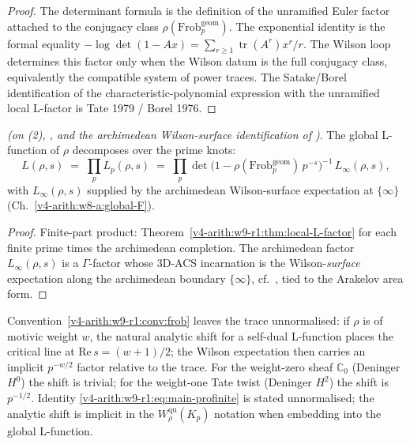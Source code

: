 \begin{proof}
The determinant formula is the definition of the unramified Euler factor
attached to the conjugacy class \(\rho(\mathrm{Frob}_{p}^{\mathrm{geom}})\). The
exponential identity is the formal equality
\(-\log\det(1-Ax)=\sum_{r\geq1}\operatorname{tr}(A^{r})x^r/r\). The
Wilson loop determines this factor only when the Wilson datum is the full
conjugacy class, equivalently the compatible system of power traces. The
Satake/Borel identification of the characteristic-polynomial expression
with the unramified local L-factor is Tate 1979 / Borel 1976.
\end{proof}

\begin{corollary}
\label{v4-arith:w9-r1:cor:global-L}
\ClaimStatusConditional \emph{(on
(2),
, and the archimedean Wilson-surface
identification of )}. The
global L-function of \(\rho\) decomposes over the prime knots:
\begin{equation}
\label{v4-arith:w9-r1:eq:global-L}
L(\rho,s)\;=\;\prod_{p}L_{p}(\rho,s)
\;=\;\prod_{p}\det\!\bigl(1-\rho(\mathrm{Frob}_{p}^{\mathrm{geom}})\,p^{-s}\bigr)^{-1}\,
L_{\infty}(\rho,s),
\end{equation}
with \(L_{\infty}(\rho,s)\) supplied by the archimedean Wilson-surface
expectation at \(\{\infty\}\) (Ch.~\ref{v4-arith:w8-a:global-F}).
\end{corollary}

\begin{proof}
Finite-part product: Theorem~\ref{v4-arith:w9-r1:thm:local-L-factor}
for each finite prime times the archimedean completion. The archimedean
factor \(L_{\infty}(\rho,s)\) is a \(\Gamma\)-factor whose 3D-ACS
incarnation is the Wilson-\emph{surface} expectation along the
archimedean boundary \(\{\infty\}\), cf.\
, tied to the Arakelov area
form.
\end{proof}

\begin{remark}
\label{v4-arith:w9-r1:rem:p-shift}
Convention~\ref{v4-arith:w9-r1:conv:frob} leaves the trace
unnormalised: if \(\rho\) is of motivic weight \(w\), the natural
analytic shift for a self-dual L-function places the critical line at
\(\mathrm{Re}\,s=(w+1)/2\); the Wilson expectation then carries an
implicit \(p^{-w/2}\) factor relative to the trace. For the weight-zero
sheaf \(\mathbb C_{0}\) (Deninger \(H^{0}\)) the shift is trivial; for
the weight-one Tate twist (Deninger \(H^{2}\)) the shift is \(p^{-1/2}\).
Identity \eqref{v4-arith:w9-r1:eq:main-profinite} is stated
unnormalised; the analytic shift is implicit in the
\(W^{\mathrm{qu}}_{\rho}(K_{p})\) notation when embedding into the global
L-function.
\end{remark}

